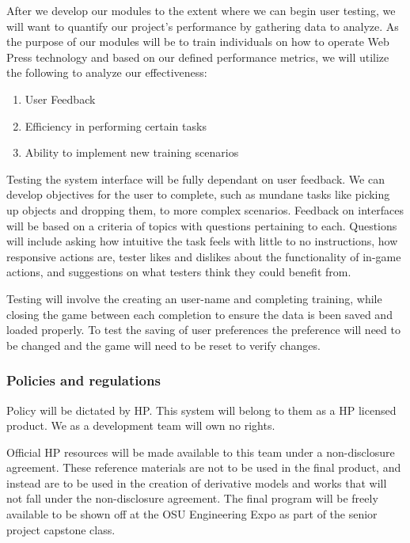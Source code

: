 \documentclass[onecolumn, draftclsnofoot,10pt, compsoc]{IEEEtran}
\begin{document}
After we develop our modules to the extent where we can begin user testing, we will want to quantify our project's performance by gathering data to analyze. As the purpose of our modules will be to train individuals on how to operate Web Press technology and based on our defined performance metrics, we will utilize the following to analyze our effectiveness: 
\begin{enumerate}
    \item User Feedback
    \item Efficiency in performing certain tasks
    \item Ability to implement new training scenarios
\end{enumerate}
Testing the system interface will be fully dependant on user feedback. We can develop objectives for the user to complete, such as mundane tasks like picking up objects and dropping them, to more complex scenarios. Feedback on interfaces will be based on a criteria of topics with questions pertaining to each. Questions will include asking how intuitive the task feels with little to no instructions, how responsive actions are, tester likes and dislikes about the functionality of in-game actions, and suggestions on what testers think they could benefit from.

Testing will involve the creating an user-name and completing training, while closing the game between each completion to ensure the data is been saved and loaded properly. To test the saving of user preferences the preference will need to be changed and the game will need to be reset to verify changes.

\subsubsection{Policies and regulations}
Policy will be dictated by HP. This system will belong to them as a HP licensed product. We as a development team will own no rights.

Official HP resources will be made available to this team under a non-disclosure agreement. These reference materials are not to be used in the final product, and instead are to be used in the creation of derivative models and works that will not fall under the non-disclosure agreement. The final program will be freely available to be shown off at the OSU Engineering Expo as part of the senior project capstone class.
\end{document}
